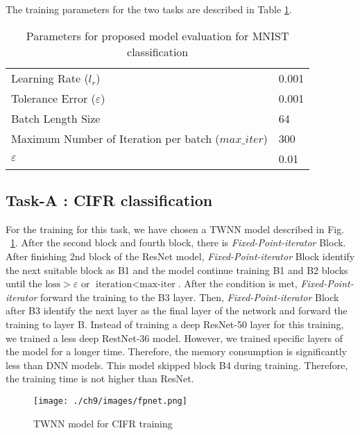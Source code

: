 \documentclass{article}
\begin{document}
 The training parameters for the two tasks are described in Table \ref{tab:parameters}.
 
\begin{table}[ht!]
	\centering
	\caption{Parameters for proposed model evaluation for MNIST classification}
	\label{tab:parameters}

	\begin{tabular}{ll}
		\toprule
		Learning Rate ($l_{r}$)& 0.001 \\
		Tolerance Error ($\varepsilon$)& 0.001  \\
		Batch Length Size &64 \\
		Maximum Number of Iteration per batch ($max\_iter$)& 300  \\
        $\varepsilon$ & 0.01\\
        \bottomrule
	\end{tabular}

\end{table}

\subsection{Task-A : CIFR  classification }

For the training for this task, we have chosen a TWNN model described in Fig. ~\ref{fig:fpnet}. After the second block and fourth block, there is \emph{Fixed-Point-iterator} Block. After finishing 2nd block of the ResNet model, \emph{Fixed-Point-iterator} Block identify the next suitable block as B1 and the model continue training B1 and B2 blocks until the $\text{loss} > \varepsilon$  or $\text{iteration} < \text{max-iter}$. After the condition is met,  \emph{Fixed-Point-iterator} forward the training to the B3 layer. Then, \emph{Fixed-Point-iterator} Block after B3 identify the next layer as the final layer of the network and forward the training to layer B. 
Instead of training a deep ResNet-50 layer for this training, we trained a less deep RestNet-36 model. However, we trained specific layers of the model for a longer time.  Therefore, the memory consumption is significantly less than DNN models. This model skipped block B4 during training. Therefore, the training time is not higher than ResNet. 

\begin{figure} [htb]
    \centering
    \texttt{[image: ./ch9/images/fpnet.png]}
    \caption{TWNN model for CIFR training}
    \label{fig:fpnet}
\end{figure}
\end{document}
